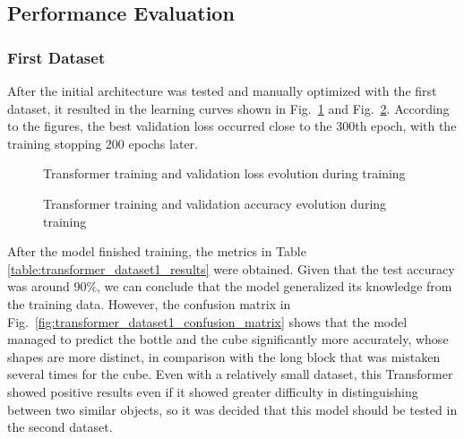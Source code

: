 \subsection{Performance Evaluation}

\subsubsection{First Dataset}

After the initial architecture was tested and manually optimized with the first dataset, it resulted in the learning curves shown in Fig.~\ref{fig:transformer_dataset1_loss} and Fig.~\ref{fig:transformer_dataset1_acc}. According to the figures, the best validation loss occurred close to the 300th epoch, with the training stopping 200 epochs later.

\begin{figure}[H]
    \centering
    {\fontsize{10}{12}\selectfont}
    \caption[Transformer training and validation loss evolution during training]{Transformer training and validation loss evolution during training}
    \label{fig:transformer_dataset1_loss}
\end{figure}

\begin{figure}[H]
    \centering
    {\fontsize{10}{12}\selectfont}
    \caption[Transformer training and validation accuracy evolution during training]{Transformer training and validation accuracy evolution during training}
    \label{fig:transformer_dataset1_acc}
\end{figure}

After the model finished training, the metrics in Table \ref{table:transformer_dataset1_results} were obtained. Given that the test accuracy was around 90\%, we can conclude that the model generalized its knowledge from the training data. However, the confusion matrix in Fig.~\ref{fig:transformer_dataset1_confusion_matrix} shows that the model managed to predict the bottle and the cube significantly more accurately, whose shapes are more distinct, in comparison with the long block that was mistaken several times for the cube. Even with a relatively small dataset, this Transformer showed positive results even if it showed greater difficulty in distinguishing between two similar objects, so it was decided that this model should be tested in the second dataset.

